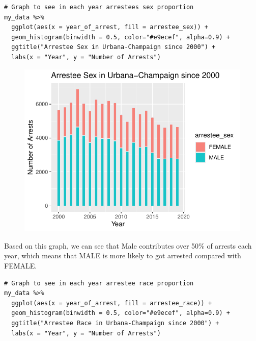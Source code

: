 \documentclass[
  article]{jss}
\begin{document}
\begin{verbatim}
# Graph to see in each year arrestees sex proportion
my_data %>% 
  ggplot(aes(x = year_of_arrest, fill = arrestee_sex)) +
  geom_histogram(binwidth = 0.5, color="#e9ecef", alpha=0.9) +
  ggtitle("Arrestee Sex in Urbana-Champaign since 2000") +
  labs(x = "Year", y = "Number of Arrests")
\end{verbatim}

\begin{figure}[H]

{\centering \includegraphics{progress-report_files/figure-pdf/unnamed-chunk-6-1.pdf}

}

\end{figure}

Based on this graph, we can see that Male contributes over 50\% of
arrests each year, which means that MALE is more likely to got arrested
compared with FEMALE.

\begin{verbatim}
# Graph to see in each year arrestee race proportion
my_data %>% 
  ggplot(aes(x = year_of_arrest, fill = arrestee_race)) +
  geom_histogram(binwidth = 0.5, color="#e9ecef", alpha=0.9) +
  ggtitle("Arrestee Race in Urbana-Champaign since 2000") +
  labs(x = "Year", y = "Number of Arrests")
\end{verbatim}
\end{document}
